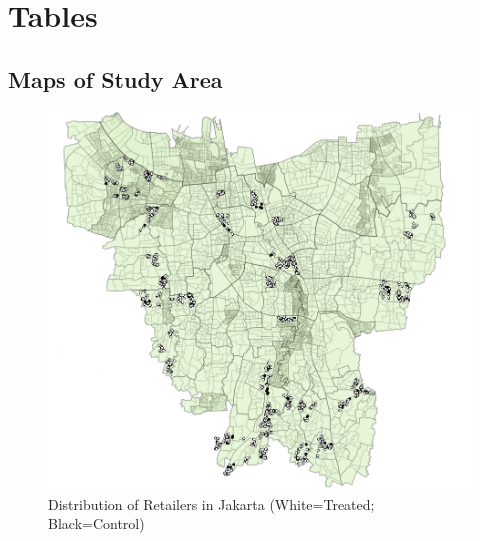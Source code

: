 \documentclass[11.5pt]{article}
\begin{document}
\clearpage




\onehalfspacing
\section*{Tables} \label{sec:tab}

\clearpage{}
\begin{appendices}


\appendix


\pagebreak
\begin{landscape}
\section{Maps of Study Area} \label{sec:maps}

\begin{figure}[h!]
    \centering
    \caption{Distribution of Retailers in Jakarta (White=Treated; Black=Control)}
    \includegraphics[width=120mm]{FigmapTC.png}
\end{figure}



\end{landscape}
\end{appendices}
\end{document}
